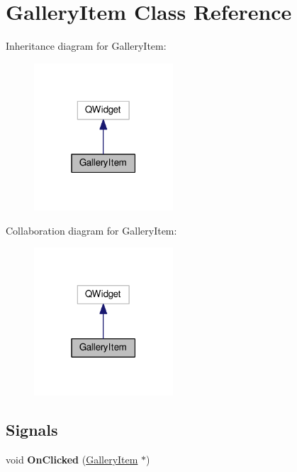 \hypertarget{class_gallery_item}{}\section{Gallery\+Item Class Reference}
\label{class_gallery_item}


Inheritance diagram for Gallery\+Item\+:\nopagebreak
\begin{figure}[H]
\begin{center}
\leavevmode
\includegraphics[width=147pt]{class_gallery_item__inherit__graph}
\end{center}
\end{figure}


Collaboration diagram for Gallery\+Item\+:\nopagebreak
\begin{figure}[H]
\begin{center}
\leavevmode
\includegraphics[width=147pt]{class_gallery_item__coll__graph}
\end{center}
\end{figure}
\subsection*{Signals}
\begin{DoxyCompactItemize}
\item 
void {\bfseries On\+Clicked} (\hyperlink{class_gallery_item}{Gallery\+Item} $\ast$)\hypertarget{class_gallery_item_a3b81d36365eaf5edfaf7a9da1df40cf3}{}\label{class_gallery_item_a3b81d36365eaf5edfaf7a9da1df40cf3}

\end{DoxyCompactItemize}
